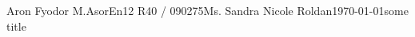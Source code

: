 \documentclass[12pt,letterpaper]{article}
\begin{document}
\begin{mla}{Aron Fyodor M.}{Asor}{En12 R40 / 090275}{Ms. Sandra Nicole Roldan}{\today}{some title}











\end{mla}
\end{document}

